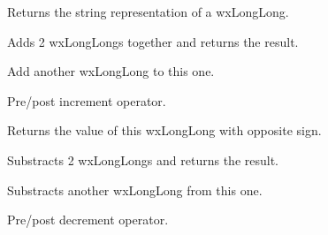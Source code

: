 \label{wxlonglongtostring}


Returns the string representation of a wxLongLong.

\label{wxlonglongoperatorplus}


Adds 2 wxLongLongs together and returns the result.

\label{wxlonglongoperatorplusassign}


Add another wxLongLong to this one.

\label{wxlonglongoperatorinc}



Pre/post increment operator.

\label{wxlonglongoperatorunaryminus}


Returns the value of this wxLongLong with opposite sign.

\label{wxlonglongoperatorminus}


Substracts 2 wxLongLongs and returns the result.

\label{wxlonglongoperatorminusassign}


Substracts another wxLongLong from this one.

\label{wxlonglongoperatordec}



Pre/post decrement operator.


